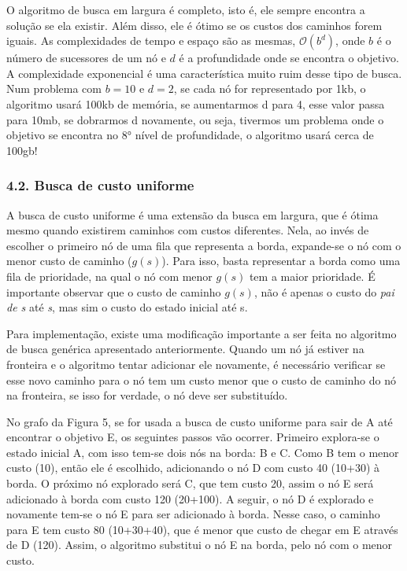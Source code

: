 \documentclass[brazil,]{article}
\begin{document}
O algoritmo de busca em largura é completo, isto é, ele sempre encontra
a solução se ela existir. Além disso, ele é ótimo se os custos dos
caminhos forem iguais. As complexidades de tempo e espaço são as mesmas,
\(\mathcal{O}(b^d)\), onde \(b\) é o número de sucessores de um nó e
\(d\) é a profundidade onde se encontra o objetivo. A complexidade
exponencial é uma característica muito ruim desse tipo de busca. Num
problema com \(b=10\) e \(d=2\), se cada nó for representado por 1kb, o
algoritmo usará 100kb de memória, se aumentarmos d para 4, esse valor
passa para 10mb, se dobrarmos d novamente, ou seja, tivermos um problema
onde o objetivo se encontra no 8° nível de profundidade, o algoritmo
usará cerca de 100gb!

\subsubsection{4.2. Busca de custo
uniforme}\label{busca-de-custo-uniforme}

A busca de custo uniforme é uma extensão da busca em largura, que é
ótima mesmo quando existirem caminhos com custos diferentes. Nela, ao
invés de escolher o primeiro nó de uma fila que representa a borda,
expande-se o nó com o menor custo de caminho (\(g(s)\)). Para isso,
basta representar a borda como uma fila de prioridade, na qual o nó com
menor \(g(s)\) tem a maior prioridade. É importante observar que o custo
de caminho \(g(s)\), não é apenas o custo do \emph{pai de s} até
\emph{s}, mas sim o custo do estado inicial até s.

Para implementação, existe uma modificação importante a ser feita no
algoritmo de busca genérica apresentado anteriormente. Quando um nó já
estiver na fronteira e o algoritmo tentar adicionar ele novamente, é
necessário verificar se esse novo caminho para o nó tem um custo menor
que o custo de caminho do nó na fronteira, se isso for verdade, o nó
deve ser substituído.

No grafo da Figura 5, se for usada a busca de custo uniforme para sair
de A até encontrar o objetivo E, os seguintes passos vão ocorrer.
Primeiro explora-se o estado inicial A, com isso tem-se dois nós na
borda: B e C. Como B tem o menor custo (10), então ele é escolhido,
adicionando o nó D com custo 40 (10+30) à borda. O próximo nó explorado
será C, que tem custo 20, assim o nó E será adicionado à borda com custo
120 (20+100). A seguir, o nó D é explorado e novamente tem-se o nó E
para ser adicionado à borda. Nesse caso, o caminho para E tem custo 80
(10+30+40), que é menor que custo de chegar em E através de D (120).
Assim, o algoritmo substitui o nó E na borda, pelo nó com o menor custo.
\end{document}
